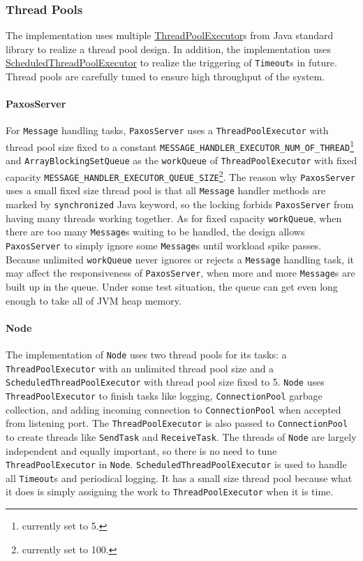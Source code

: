 \documentclass{article}
\numberwithin{equation}{section}
\begin{document}
\subsubsection{Thread Pools}
The implementation uses multiple \href{https://docs.oracle.com/javase/8/docs/api/java/util/concurrent/ThreadPoolExecutor.html}{ThreadPoolExecutor}s from Java standard library to realize a thread pool design. In addition, the implementation uses \href{https://docs.oracle.com/javase/8/docs/api/java/util/concurrent/ScheduledThreadPoolExecutor.html}{ScheduledThreadPoolExecutor} to realize the triggering of \verb|Timeout|s in future. Thread pools are carefully tuned to ensure high throughput of the system.

\paragraph{PaxosServer}For \verb|Message| handling tasks, \verb|PaxosServer| uses a \verb|ThreadPoolExecutor| with thread pool size fixed to a constant \verb|MESSAGE_HANDLER_EXECUTOR_NUM_OF_THREAD|\footnote{currently set to 5.} and \verb|ArrayBlockingSetQueue| as the \verb|workQueue| of \verb|ThreadPoolExecutor| with fixed capacity \verb|MESSAGE_HANDLER_EXECUTOR_QUEUE_SIZE|\footnote{currently set to 100.}. The reason why \verb|PaxosServer| uses a small fixed size thread pool is that all \verb|Message| handler methods are marked by \verb|synchronized| Java keyword, so the locking forbids \verb|PaxosServer| from having many threads working together. As for fixed capacity \verb|workQueue|, when there are too many \verb|Message|s waiting to be handled, the design allows \verb|PaxosServer| to simply ignore some \verb|Message|s until workload spike passes. Because unlimited \verb|workQueue| never ignores or rejects a \verb|Message| handling task, it may affect the responsiveness of \verb|PaxosServer|, when more and more \verb|Message|s are built up in the queue. Under some test situation, the queue can get even long enough to take all of JVM heap memory.

\paragraph{Node}The implementation of \verb|Node| uses two thread pools for its tasks: a \verb|ThreadPoolExecutor| with an unlimited thread pool size and a \verb|ScheduledThreadPoolExecutor| with thread pool size fixed to 5. \verb|Node| uses \verb|ThreadPoolExecutor| to finish tasks like logging, \verb|ConnectionPool| garbage collection, and adding incoming connection to \verb|ConnectionPool| when accepted from listening port. The \verb|ThreadPoolExecutor| is also passed to \verb|ConnectionPool| to create threads like \verb|SendTask| and \verb|ReceiveTask|. The threads of \verb|Node| are largely independent and equally important, so there is no need to tune \verb|ThreadPoolExecutor| in \verb|Node|. \verb|ScheduledThreadPoolExecutor| is used to handle all \verb|Timeout|s and periodical logging. It has a small size thread pool because what it does is simply assigning the work to \verb|ThreadPoolExecutor| when it is time.
\end{document}
